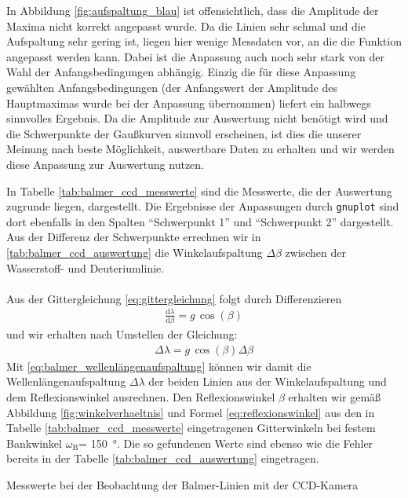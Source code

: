 \documentclass[11pt, a4paper]{article}
\numberwithin{equation}{section}
\begin{document}
\FloatBarrier
In Abbildung \ref{fig:aufspaltung_blau} ist offensichtlich, dass die Amplitude der Maxima nicht korrekt angepasst wurde.
Da die Linien sehr schmal und die Aufspaltung sehr gering ist, liegen hier wenige Messdaten vor, an die die Funktion angepasst werden kann.
Dabei ist die Anpassung auch noch sehr stark von der Wahl der Anfangsbedingungen abhängig.
Einzig die für diese Anpassung gewählten Anfangsbedingungen (der Anfangswert der Amplitude des Hauptmaximas wurde bei der Anpassung übernommen) liefert ein halbwegs sinnvolles Ergebnis.
Da die Amplitude zur Auswertung nicht benötigt wird und die Schwerpunkte der Gaußkurven sinnvoll erscheinen, ist dies die unserer Meinung nach beste Möglichkeit, auswertbare Daten zu erhalten und wir werden diese Anpassung zur Auswertung nutzen.

In Tabelle \ref{tab:balmer_ccd_messwerte} sind die Messwerte, die der Auswertung zugrunde liegen, dargestellt.
Die Ergebnisse der Anpassungen durch \texttt{gnuplot} sind dort ebenfalls  in den Spalten "`Schwerpunkt 1"' und "`Schwerpunkt 2"' dargestellt.
Aus der Differenz der Schwerpunkte errechnen wir in \ref{tab:balmer_ccd_auswertung} die Winkelaufspaltung $\Delta\beta$ zwischen der Wasserstoff- und Deuteriumlinie.\\
\\
Aus der Gittergleichung \eqref{eq:gittergleichung} folgt durch Differenzieren
\begin{align*}
\frac{\text{d}\lambda}{\text{d}\beta}=g\,\cos(\beta)
\end{align*}
und wir erhalten nach Umstellen der Gleichung:
\begin{align}
\Delta\lambda=g\,\cos(\beta)\Delta\beta
\label{eq:balmer_wellenlängenaufspaltung}
\end{align}
Mit \eqref{eq:balmer_wellenlängenaufspaltung} können wir damit die Wellenlängenaufspaltung $\Delta\lambda$ der beiden Linien aus der Winkelaufspaltung und dem Reflexionswinkel ausrechnen.
Den Reflexionswinkel $\beta$ erhalten wir gemäß Abbildung \ref{fig:winkelverhaeltnis} und Formel  \eqref{eq:reflexionswinkel} aus den in Tabelle \ref{tab:balmer_ccd_messwerte} eingetragenen Gitterwinkeln bei festem Bankwinkel $\omega_\text{B}$= \SI{150}{\degree}.
Die so gefundenen Werte sind ebenso wie die Fehler bereits in der Tabelle \ref{tab:balmer_ccd_auswertung} eingetragen.
\begin{table}[h]
\centering
\resizebox{\columnwidth}{!}{%
}
\caption{Messwerte bei der Beobachtung der Balmer-Linien mit der CCD-Kamera}
\label{tab:balmer_ccd_messwerte}
\end{table}
\end{document}
